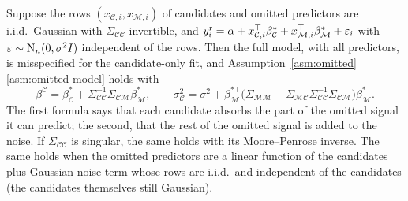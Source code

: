 
\begin{example}\label{ex:omitted}
Suppose the rows $(x_{\mathcal C,i},x_{\mathcal M,i})$ of candidates and omitted predictors are i.i.d.\ Gaussian with
$\Sigma_{\mathcal C\mathcal C}$ invertible, and
$y^{\mathrm r}_i=\alpha+x_{\mathcal C,i}^\top\beta^*_{\mathcal C}+x_{\mathcal M,i}^\top\beta^*_{\mathcal M}+\varepsilon_i$ with
$\varepsilon\sim\mathrm{N}_n(0,\sigma^2I)$ independent of the rows. Then the full model,
with all predictors, is misspecified for the candidate-only fit, and Assumption~\ref{asm:omitted}\ref{asm:omitted-model} holds with
\[
  \beta^{\mathcal C}=\beta^*_{\mathcal C}+\Sigma_{\mathcal C\mathcal C}^{-1}\Sigma_{\mathcal C\mathcal M}\beta^*_{\mathcal M},
  \qquad
  \sigma^2_{\mathcal C}=\sigma^2+\beta^{*\top}_{\mathcal M}\big(\Sigma_{\mathcal M\mathcal M}
  -\Sigma_{\mathcal M\mathcal C}\Sigma_{\mathcal C\mathcal C}^{-1}\Sigma_{\mathcal C\mathcal M}\big)\beta^*_{\mathcal M}.
\]
The first formula says that each candidate absorbs the part of the omitted signal it can predict; the second, that the
rest of the omitted signal is added to the noise. If $\Sigma_{\mathcal C\mathcal C}$ is singular, the same holds with its
Moore--Penrose inverse. The same holds when the omitted predictors are a linear function of the candidates plus Gaussian
noise term whose rows are i.i.d.\ and independent of the candidates (the candidates themselves still Gaussian).
\end{example}


